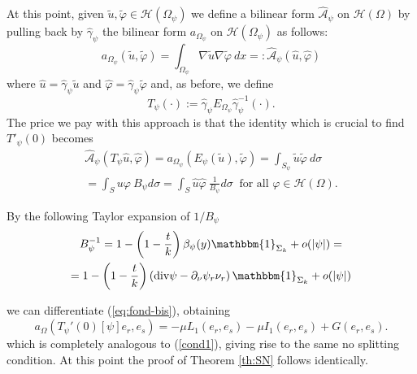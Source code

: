 \documentclass[a4paper,reqno,11pt,oneside]{amsart}
\theoremstyle{plain}
\theoremstyle{plain}
\theoremstyle{plain}
\theoremstyle{remark}
\def\div{\textup{div}}
\begin{document}
At this point, given $\tilde u,\tilde \varphi \in \mathcal{H}(\Omega_\psi)$ we define a bilinear form $\hat{\mathcal{A}}_\psi$  on $\mathcal{H}(\Omega)$ by pulling back by $\hat \gamma_\psi$ the bilinear form  $a_{\Omega_\psi} $ on $\mathcal{H} (\Omega_\psi)$ as follows:
\begin{equation}
a_{\Omega_\psi}(\tilde u,\tilde \varphi)=\int_{\Omega_\psi} \nabla \tilde u \nabla \tilde \varphi \ dx  =:\hat{\mathcal{A}}_\psi (\hat u,\hat \varphi) 
\end{equation}
where $\hat u=\hat \gamma_{\psi}\tilde u$ and $\hat\varphi=\hat\gamma_{\psi} \tilde \varphi$  and, as before, we define
 \begin{equation}
 T_\psi({\cdot }):=\hat\gamma_\psi E_{\Omega_\psi} \hat\gamma_\psi^{-1}({\cdot}).
 \end{equation}
The price we pay with this approach is that the identity which is crucial to find $T'_\psi(0)$ becomes
  \begin{multline}
       \label{eq:fond-bis}
     \hat{\mathcal{A}}_\psi (T_\psi{\hat u},\hat \varphi) =a_{\Omega_\psi}(E_{\psi}(\tilde u),\tilde \varphi)=\int_{S_\psi}  \tilde u \tilde \varphi\  d\sigma \\
     =\int_{S} u\varphi\ B_\psi d\sigma 
      =\int_{S} \hat u\hat \varphi\ \frac1{B_\psi} d\sigma 
 \    \text { for all }\varphi \in \mathcal{H}(\Omega). 
 \end{multline}

By the following Taylor expansion of $1/B_\psi$
\begin{multline}
    \label{derBpsi-bis}
    B_\psi^{-1}=1-\left(1-\frac tk\right)\beta_\psi(y)\mathbbm{1}_{\Sigma_k}+o(|\psi|)=\\
    =1-\left(1-\frac tk\right)\left(\div \psi -  \partial_\nu \psi_r\nu_r\right)\mathbbm{1}_{\Sigma_k}+o(|\psi|)
\end{multline}

we can differentiate (\ref{eq:fond-bis}), obtaining 
\begin{equation}\label{nosplit-bis}
a_\Omega(T_\psi '(0)[\psi]e_r,e_s)=
-\mu L_1(e_r,e_s)
-\mu I_1(e_r,e_s)+G(e_r,e_s).
\end{equation}
which is completely analogous to (\ref{cond1}), giving rise to the same no splitting condition. At this point the proof of Theorem \ref{th:SN} follows identically.






\end{document}
